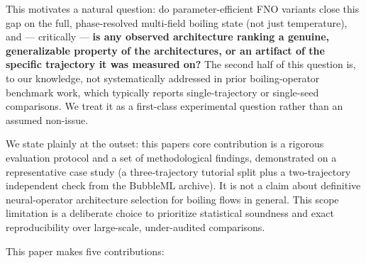 \documentclass[preprint,12pt]{elsarticle}
\begin{document}
This motivates a natural question: do parameter-efficient FNO variants
close this gap on the full, phase-resolved multi-field boiling state
(not just temperature), and --- critically --- \textbf{is any observed
architecture ranking a genuine, generalizable property of the
architectures, or an artifact of the specific trajectory it was measured
on?} The second half of this question is, to our knowledge, not
systematically addressed in prior boiling-operator benchmark work, which
typically reports single-trajectory or single-seed comparisons. We treat
it as a first-class experimental question rather than an assumed
non-issue.

We state plainly at the outset: this paper\textquotesingle s core
contribution is a rigorous evaluation protocol and a set of
methodological findings, demonstrated on a representative case study (a
three-trajectory tutorial split plus a two-trajectory independent check
from the BubbleML archive). It is not a claim about definitive
neural-operator architecture selection for boiling flows in general.
This scope limitation is a deliberate choice to prioritize statistical
soundness and exact reproducibility over large-scale, under-audited
comparisons.

This paper makes five contributions:
\end{document}
